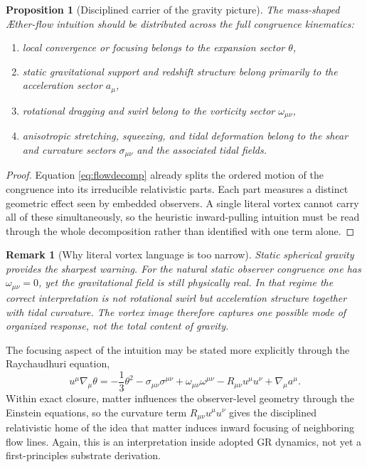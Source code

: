 \documentclass[11pt]{article}
\newcommand{\Aflow}{\AE{}ther-flow}
\newtheorem{proposition}{Proposition}
\newtheorem{remark}{Remark}
\begin{document}
\begin{proposition}[Disciplined carrier of the gravity picture]
The mass-shaped \Aflow{} intuition should be distributed across the full congruence kinematics:
\begin{enumerate}
    \item local convergence or focusing belongs to the expansion sector \(\theta\),
    \item static gravitational support and redshift structure belong primarily to the acceleration sector \(a_\mu\),
    \item rotational dragging and swirl belong to the vorticity sector \(\omega_{\mu\nu}\),
    \item anisotropic stretching, squeezing, and tidal deformation belong to the shear and curvature sectors \(\sigma_{\mu\nu}\) and the associated tidal fields.
\end{enumerate}
\end{proposition}

\begin{proof}
Equation \eqref{eq:flowdecomp} already splits the ordered motion of the congruence into its irreducible relativistic parts. Each part measures a distinct geometric effect seen by embedded observers. A single literal vortex cannot carry all of these simultaneously, so the heuristic inward-pulling intuition must be read through the whole decomposition rather than identified with one term alone.
\end{proof}

\begin{remark}[Why literal vortex language is too narrow]
Static spherical gravity provides the sharpest warning. For the natural static observer congruence one has \(\omega_{\mu\nu}=0\), yet the gravitational field is still physically real. In that regime the correct interpretation is not rotational swirl but acceleration structure together with tidal curvature. The vortex image therefore captures one possible mode of organized response, not the total content of gravity.
\end{remark}

The focusing aspect of the intuition may be stated more explicitly through the Raychaudhuri equation,
\begin{equation}
u^\mu\nabla_\mu\theta
=
-\frac13\theta^2
-\sigma_{\mu\nu}\sigma^{\mu\nu}
+\omega_{\mu\nu}\omega^{\mu\nu}
-R_{\mu\nu}u^\mu u^\nu
+\nabla_\mu a^\mu.
\label{eq:ray}
\end{equation}
Within exact closure, matter influences the observer-level geometry through the Einstein equations, so the curvature term \(R_{\mu\nu}u^\mu u^\nu\) gives the disciplined relativistic home of the idea that matter induces inward focusing of neighboring flow lines. Again, this is an interpretation inside adopted GR dynamics, not yet a first-principles substrate derivation.
\end{document}
